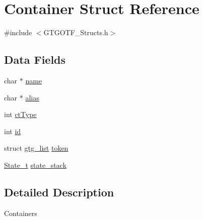 \hypertarget{structContainer}{\section{Container Struct Reference}
\label{structContainer}
}


{\ttfamily \#include $<$G\-T\-G\-O\-T\-F\-\_\-\-Structs.\-h$>$}

\subsection*{Data Fields}
\begin{DoxyCompactItemize}
\item 
char $\ast$ \hyperlink{structContainer_a67ce2f5aefbdfebfdf389731573933e1}{name}
\item 
char $\ast$ \hyperlink{structContainer_a92f0174d6eca6c4a0ef3e2ffef8be3e8}{alias}
\item 
int \hyperlink{structContainer_a4adf9cd564185bb1cee25d45a82c4f99}{ct\-Type}
\item 
int \hyperlink{structContainer_a055522338ea708fbdfbd6ddb4854b313}{id}
\item 
struct \hyperlink{structgtg__list}{gtg\-\_\-list} \hyperlink{structContainer_aacb0d89296e0646bc3b7c14b2e4636f4}{token}
\item 
\hyperlink{GTGOTF__Structs_8h_a7c570e29d458693c8eac4d704a62f794}{State\-\_\-t} \hyperlink{structContainer_ae9e5eda153387bcd46a4a4495b7e044e}{state\-\_\-stack}
\end{DoxyCompactItemize}


\subsection{Detailed Description}
Containers 

